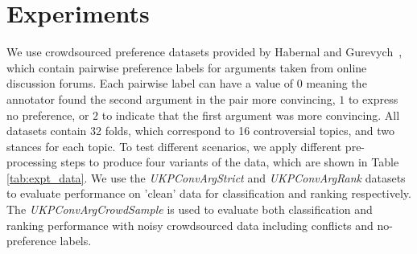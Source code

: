 \section{Experiments}\label{sec:expts}




We use crowdsourced preference datasets provided by 
Habernal and Gurevych~,
which contain pairwise preference labels for arguments taken from online discussion forums. 
Each pairwise label can have a value of $0$ meaning the annotator found the second argument in the pair more convincing,
$1$ to express no preference, or $2$ to indicate that the first argument was more convincing.
All datasets contain 32 folds, which correspond to 16 controversial topics, and two stances for each topic.
To test different scenarios, we apply different pre-processing steps to produce 
four variants of the data, which are shown in Table \ref{tab:expt_data}.
We use the \emph{UKPConvArgStrict} and \emph{UKPConvArgRank} datasets to evaluate performance on 'clean' data for
 classification and ranking respectively. The 
 \emph{UKPConvArgCrowdSample} is used to evaluate both classification
 and ranking performance with noisy crowdsourced data including conflicts and no-preference labels.
